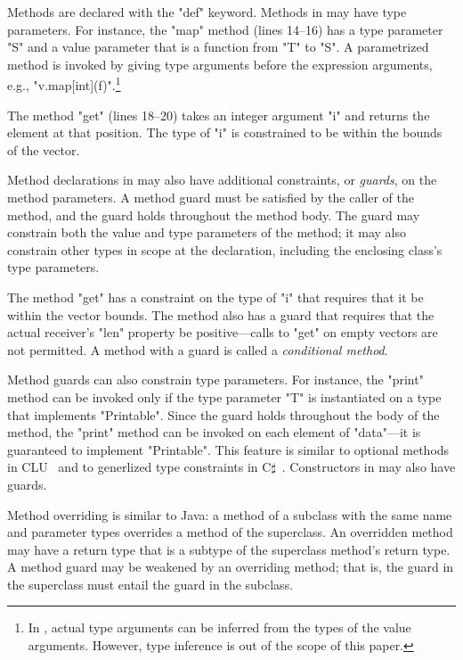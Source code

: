 Methods are declared with the \xcd"def" keyword.
Methods in \Xten may have type parameters.  
For instance, the \xcd"map" method (lines 14--16)
has a type parameter \xcd"S" and a value parameter that is a
function from \xcd"T" to \xcd"S".
A parametrized method is invoked by giving type arguments before the
expression arguments, e.g., \xcd"v.map[int](f)".\footnote{In \Xten, actual type
arguments can be inferred from the types of the value arguments.  However, type
inference is out of the scope of this paper.}

The method \xcd"get" (lines 18--20) takes an integer argument \xcd"i"
and returns the element at that position.  The type of \xcd"i"
is constrained to be within the bounds of the vector. 

Method declarations in \Xten
may also have additional
constraints, or \emph{guards}, on the method parameters.  A
method guard must be satisfied by the caller of the method, and
the guard holds throughout the method body.
The guard may constrain both the value and type parameters of
the method; it may also constrain other types in
scope at the declaration, including the enclosing class's type parameters.

The method \xcd"get"
has a constraint on the type of \xcd"i" that requires
that it be within the vector bounds.
The method also has a guard that
requires that the actual
receiver's
\xcd"len" property be positive---calls to \xcd"get" on empty
vectors are not permitted.
A method with a guard is called a \emph{conditional method}.

Method guards can also constrain type parameters.
For instance, the \xcd"print" method can be invoked only if
the type parameter \xcd"T" is instantiated on a type that implements
\xcd"Printable".  Since the guard holds throughout the body of the
method, the \xcd"print" method can be invoked on each element of \xcd"data"---it
is guaranteed to implement \xcd"Printable".
This feature is similar to optional methods in CLU~\cite{clu} and to generlized type constraints in C$\sharp$~\cite{emir06}.
Constructors in \Xten may also have guards.

Method overriding is similar to Java: a method of a subclass
with the same name and parameter types overrides a method of the
superclass.  An overridden method may have a return type that is
a subtype of the superclass method's return type.
A method guard may be weakened by an overriding
method; that is, the guard in the superclass must entail the  
guard in the subclass.

